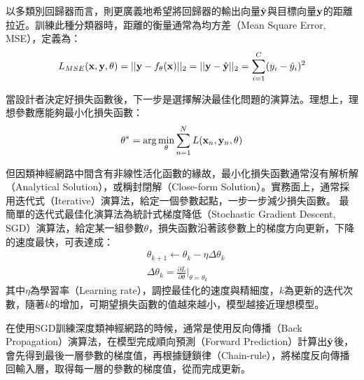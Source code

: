 以多類別回歸器而言，則更廣義地希望將回歸器的輸出向量$\hat{\bold{y}}$與目標向量$\bold{y}$的距離拉近。訓練此種分類器時，距離的衡量通常為均方差（Mean Square Error, MSE），定義為：
\begin{equation}
L_{MSE}(\bold{x} , \bold{y} , \theta) = || \bold{y} - f_{\theta}(\bold{x}) ||_2 = || \bold{y} - \hat{\bold{y}} ||_2 = \sum_{i = 1}^{C} ( y_i - \hat{y}_i )^2 
\end{equation}

當設計者決定好損失函數後，下一步是選擇解決最佳化問題的演算法。理想上，理想參數應能夠最小化損失函數：
\begin{equation}
\theta^* = \arg\min_{\theta}{ \sum_{n=1}^{N}{ {L( \bold{x}_n , \bold{y}_n , \theta)}}}
\end{equation}

但因類神經網路中間含有非線性活化函數的緣故，最小化損失函數通常沒有解析解（Analytical
Solution），或稱封閉解（Close-form Solution）。實務面上，通常採用迭代式（Iterative）演算法，給定一個參數起點，一步一步減少損失函數。
最簡單的迭代式最佳化演算法為統計式梯度降低（Stochastic Gradient Descent, SGD）演算法，給定某一組參數$\theta$，損失函數沿著該參數上的梯度方向更新，下降的速度最快，可表達成：
\begin{equation}
	\begin{aligned}
	&\theta_{k+1} \leftarrow \theta_k - \eta \Delta \theta_{k} 
	\\
	&\Delta \theta_{k} = \frac{\partial L}{\partial \theta} \biggr|_{\theta = \theta_k}
	\end{aligned}
\end{equation}
其中$\eta$為學習率（Learning rate），調控最佳化的速度與精細度，$k$為更新的迭代次數，隨著$k$的增加，可期望損失函數的值越來越小，模型越接近理想模型。


在使用SGD訓練深度類神經網路的時候，通常是使用反向傳播（Back
Propagation）演算法，在模型完成順向預測（Forward
Prediction）計算出$\hat{\bold{y}}$後，會先得到最後一層參數的梯度值，再根據鏈鎖律（Chain-rule），將梯度反向傳播回輸入層，取得每一層的參數的梯度值，從而完成更新。


